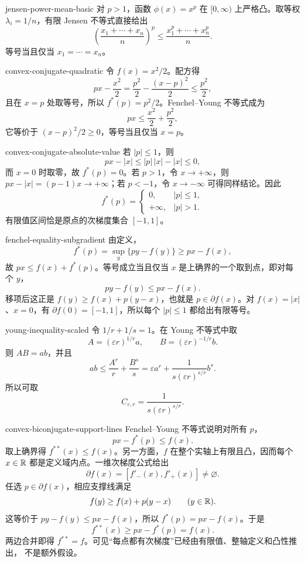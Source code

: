 \begin{solution}{jensen-power-mean-basic}
对 \(p>1\)，函数 \(\phi(x)=x^p\) 在 \([0,\infty)\) 上严格凸。取等权 \(\lambda_i=1/n\)，有限 Jensen 不等式直接给出
\[
 \left(\frac{x_1+\cdots+x_n}{n}\right)^p
 \le\frac{x_1^p+\cdots+x_n^p}{n}.
\]
等号当且仅当 \(x_1=\cdots=x_n\)。
\end{solution}

\begin{solution}{convex-conjugate-quadratic}
令 \(f(x)=x^2/2\)。配方得
\[
 px-\frac{x^2}{2}
 =\frac{p^2}{2}-\frac{(x-p)^2}{2}\le\frac{p^2}{2},
\]
且在 \(x=p\) 处取等号，所以 \(f^*(p)=p^2/2\)。Fenchel--Young 不等式成为
\[
 px\le\frac{x^2}{2}+\frac{p^2}{2},
\]
它等价于 \((x-p)^2/2\ge0\)，等号当且仅当 \(x=p\)。
\end{solution}

\begin{solution}{convex-conjugate-absolute-value}
若 \(|p|\le1\)，则
\[
 px-|x|\le |p|\,|x|-|x|\le0,
\]
而 \(x=0\) 时取零，故 \(f^*(p)=0\)。若 \(p>1\)，令 \(x\to+\infty\)，则 \(px-|x|=(p-1)x\to+\infty\)；若 \(p<-1\)，令 \(x\to-\infty\) 可得同样结论。因此
\[
 f^*(p)=\begin{cases}0,&|p|\le1,\\+\infty,&|p|>1.\end{cases}
\]
有限值区间恰是原点的次梯度集合 \([-1,1]\)。
\end{solution}

\begin{solution}{fenchel-equality-subgradient}
由定义，
\[
 f^*(p)=\sup_y\{py-f(y)\}\ge px-f(x),
\]
故 \(px\le f(x)+f^*(p)\)。等号成立当且仅当 \(x\) 是上确界的一个取到点，即对每个 \(y\)，
\[
 py-f(y)\le px-f(x).
\]
移项后这正是 \(f(y)\ge f(x)+p(y-x)\)，也就是 \(p\in\partial f(x)\)。对 \(f(x)=|x|\)、\(x=0\)，有 \(\partial f(0)=[-1,1]\)，所以每个 \(|p|\le1\) 都给出有限等号。
\end{solution}

\begin{solution}{young-inequality-scaled}
令 \(1/r+1/s=1\)。在 Young 不等式中取
\[
 A=(\varepsilon r)^{1/r}a,
 \qquad B=(\varepsilon r)^{-1/r}b.
\]
则 \(AB=ab\)，并且
\[
 ab\le\frac{A^r}{r}+\frac{B^s}{s}
 =\varepsilon a^r+\frac{1}{s(\varepsilon r)^{s/r}}b^s.
\]
所以可取
\[
 C_{\varepsilon,r}=\frac{1}{s(\varepsilon r)^{s/r}}.
\]
\end{solution}

\begin{solution}{convex-biconjugate-support-lines}
Fenchel--Young 不等式说明对所有 \(p\)，
\[
 px-f^*(p)\le f(x).
\]
取上确界得 \(f^{**}(x)\le f(x)\)。另一方面，\(f\) 在整个实轴上有限且凸，因而每个
\(x\in\mathbb{R}\) 都是定义域内点。一维次梯度公式给出
\[
 \partial f(x)=[f'_-(x),f'_+(x)]\ne\varnothing.
\]
任选 \(p\in\partial f(x)\)，相应支撑线满足
\[
 f(y)\ge f(x)+p(y-x)\qquad(y\in\mathbb{R}).
\]
这等价于 \(py-f(y)\le px-f(x)\)，所以 \(f^*(p)=px-f(x)\)。于是
\[
 f^{**}(x)\ge px-f^*(p)=f(x).
\]
两边合并即得 \(f^{**}=f\)。可见“每点都有次梯度”已经由有限值、整轴定义和凸性推出，
不是额外假设。
\end{solution}

